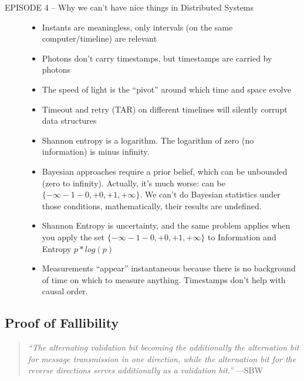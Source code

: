 \documentclass[../../../OAE-SPEC-MAIN.tex]{subfiles}
\begin{document}
\begin{description}
\item [EPISODE 4  -- Why we can’t have nice things in Distributed Systems] \mbox{}
	\begin{itemize}
	\item  Instants are meaningless, only intervals (on the same computer/timeline) are relevant
	\item  Photons don’t carry timestamps, but timestamps are carried by photons
	\item The speed of light is the ``pivot'' around which time and space evolve
	\item Timeout and retry (TAR) on different timelines will silently corrupt data structures
	\item  Shannon entropy is a logarithm. The logarithm of zero (no information) is minus infinity.
	\item  Bayesian approaches require a prior belief, which can be unbounded (zero to infinity). Actually, it’s much worse: can be $\{-\infty-1-0,+0,+1,+\infty\}$. We can’t do Bayesian statistics under those conditions, mathematically, their results are undefined.
	\item Shannon Entropy is uncertainty, and the same problem applies when you apply the set $\{-\infty-1-0,+0,+1,+\infty\}$ to Information and Entropy $p*log(p)$
	\item  Measurements ``appear'' instantaneous because there is no background of time on which to measure anything. Timestamps don’t help with causal order.
	\end{itemize}
\end{description}



\subsection{Proof of Fallibility}

\begin{quote}
\textit{``The alternating validation bit becoming the additionally the \emph{alternation} bit for message transmission in one direction, while the alternation bit for the reverse directions serves additionally as a validation bit.''} \hfill ---SBW \cite{BSW}
\end{quote}
\end{document}
